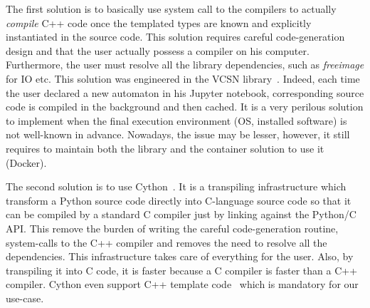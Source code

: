 The first solution is to basically use system call to the compilers to actually \emph{compile} C++ code once the
templated types are known and explicitly instantiated in the source code. This solution requires careful code-generation
design and that the user actually possess a compiler on his computer. Furthermore, the user must resolve all the
library dependencies, such as \emph{freeimage} for IO etc. This solution was engineered in the VCSN
library~\parencite{demaille.2013.vcsn}. Indeed, each time the user declared a new automaton in his Jupyter notebook,
corresponding source code is compiled in the background and then cached. It is a very perilous solution to implement
when the final execution environment (OS, installed software) is not well-known in advance. Nowadays, the issue may be
lesser, however, it still requires to maintain both the library and the container solution to use it (Docker).

The second solution is to use Cython~\parencite{behnel.2010.cython}. It is a transpiling infrastructure which transform
a Python source code directly into C-language source code so that it can be compiled by a standard C compiler just by
linking against the Python/C API. This remove the burden of writing the careful code-generation routine, system-calls
to the C++ compiler and removes the need to resolve all the dependencies. This infrastructure takes care of everything
for the user. Also, by transpiling it into C code, it is faster because a C compiler is faster than a C++ compiler.
Cython even support C++ template code~\parencite{behnel.2022.cython-template} which is mandatory for our use-case.

